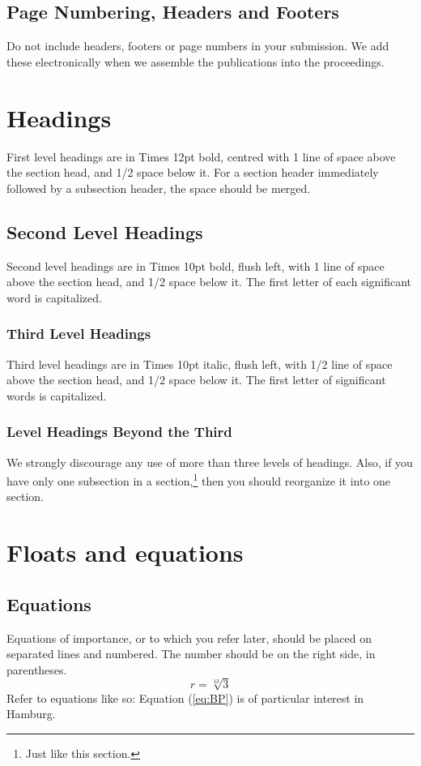 \documentclass{article}
\begin{document}
\subsection{Page Numbering, Headers and Footers}
Do not include headers, footers or page numbers in your submission.
We add these electronically when we assemble the publications
into the proceedings.

\section{Headings}
First level headings are in Times 12pt bold,
centred with 1 line of space above the section head, and 1/2 space below it.
For a section header immediately followed by a subsection header, the space 
should be merged.

\subsection{Second Level Headings}
Second level headings are in Times 10pt bold, flush left,
with 1 line of space above the section head, and 1/2 space below it.
The first letter of each significant word is capitalized.

\subsubsection{Third Level Headings}
Third level headings are in Times 10pt italic, flush left,
with 1/2 line of space above the section head, and 1/2 space below it.
The first letter of significant words is capitalized.

\subsubsection{Level Headings Beyond the Third}
We strongly discourage any use of
more than three levels of headings.
Also, if you have only one subsection in a section,\footnote{Just like this section.}
then you should reorganize it into one section.

\section{Floats and equations}

\subsection{Equations}
Equations of importance, 
or to which you refer later,
should be placed on separated lines and numbered.
The number should be on the right side, in parentheses.
\begin{equation}
r=\sqrt[13]{3}
\label{eq:BP}
\end{equation}
Refer to equations like so:
Equation (\ref{eq:BP}) is of particular 
interest in Hamburg.
\end{document}
